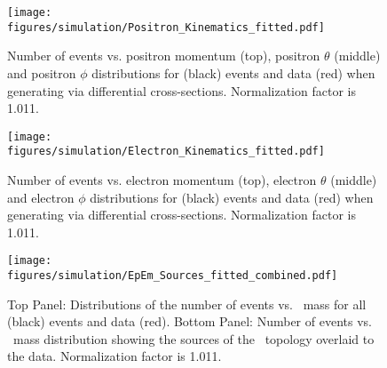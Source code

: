 				\begin{figure}[h!]\begin{center}
						\texttt{[image: \\figures/simulation/Positron\_Kinematics\_fitted.pdf]}
						\caption[Number of events vs. positron momentum (top), positron $\theta$ (middle) and positron $\phi$ distributions for  (black) events and data (red) when generating  via differential cross-sections]{\label{fig:simsmear.Ep}Number of events vs. positron momentum (top), positron $\theta$ (middle) and positron $\phi$ distributions for  (black) events and data (red) when generating  via differential cross-sections. Normalization factor is 1.011.}
					\end{center}\end{figure} 
					\begin{figure}[h!]\begin{center}
							\texttt{[image: \\figures/simulation/Electron\_Kinematics\_fitted.pdf]}
							\caption[Number of events vs. electron momentum (top), electron $\theta$ (middle) and electron $\phi$ distributions for  (black) events and data (red) when generating  via differential cross-sections]{\label{fig:simsmear.Em}Number of events vs. electron momentum (top), electron $\theta$ (middle) and electron $\phi$ distributions for  (black) events and data (red) when generating  via differential cross-sections. Normalization factor is 1.011. }
						\end{center}\end{figure} 
						\begin{figure}[h!]\begin{center}
								\texttt{[image: \\figures/simulation/EpEm\_Sources\_fitted\_combined.pdf]}
								\caption[Number of events vs. \epemT \ mass for all  (black) events and data (red)]{\label{fig:simsmear.EpEm}Top Panel: Distributions of the number of events vs. \epemT \ mass for all  (black) events and data (red). Bottom Panel: Number of events vs. \epemT \ mass distribution showing the sources of the  \epemT \ topology overlaid to the data. Normalization factor is 1.011.}
							\end{center}\end{figure} 
							
							\FloatBarrier